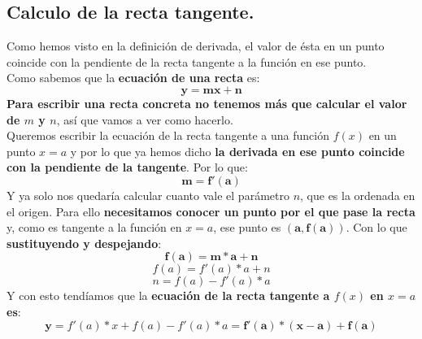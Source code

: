 \documentclass[a4paper,11pt,answers]{exam}
\begin{document}
\subsection{Calculo de la recta tangente.}
Como hemos visto en la definición de derivada, el valor de ésta en un punto coincide con la pendiente de la recta tangente a la función en ese punto.\\

Como sabemos que la \textbf{ecuación de una recta} es:
\[\boldsymbol{y = mx + n}\]
\textbf{Para escribir una recta concreta no tenemos más que calcular el valor de $m$ y $n$}, así que vamos a ver como hacerlo.\\

Queremos escribir la ecuación de la recta tangente a una función $f(x)$ en un punto $x=a$ y por lo que ya hemos dicho \textbf{la derivada en ese punto coincide con la pendiente de la tangente}. Por lo que:
\[\boldsymbol{m = f'(a)}\]
Y ya solo nos quedaría calcular cuanto vale el parámetro $n$, que es la ordenada en el origen. Para ello \textbf{necesitamos conocer un punto por el que pase la recta} y, como es tangente a la función en $x=a$, ese punto es $\boldsymbol{(a, f(a))}$. Con lo que \textbf{sustituyendo y despejando}:
\[\boldsymbol{f(a) = m *a + n}\]
\[f(a) = f'(a) * a + n\]
\[n = f(a) - f'(a)*a\]
Y con esto tendíamos que la \textbf{ecuación de la recta tangente a $f(x)$ en $x=a$ es}:
\[\boldsymbol{y} = f'(a)*x + f(a) - f'(a)*a \boldsymbol{= f'(a)*(x-a) + f(a)}\]
\end{document}
